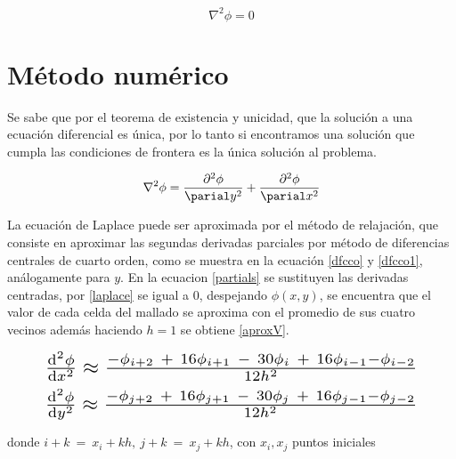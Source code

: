 \begin{equation}
\label{laplace}
    \nabla^2 \phi =0
\end{equation}

\section{ Método numérico}

Se sabe que por el teorema de existencia y unicidad, que la solución a una ecuación diferencial es única, por lo tanto si encontramos una solución que cumpla las condiciones de frontera es la única solución al problema. 

\begin{equation}
\label{partials}
\nabla^2 \phi = \frac{\partial^2 \phi}{\parial y^2} + \frac{\partial^2 \phi}{\parial x^2} 
\end{equation}




La ecuación de Laplace puede ser aproximada por el método de relajación, que consiste en aproximar las segundas derivadas parciales por método de diferencias centrales de cuarto orden, como se muestra en la ecuación \ref{dfcco} y \ref{dfcco1}, análogamente para $y$. En la ecuacion \ref{partials} se sustituyen las derivadas centradas, por \ref{laplace} se igual a 0, despejando $\phi(x,y)$, se encuentra que  el valor de cada celda del mallado se aproxima con el promedio de sus cuatro vecinos además haciendo $h=1$ se obtiene \ref{aproxV}.




\begin{equation}
\label{dfcco1}
\resizebox{.9\columnwidth }{!}{
$\dv[2]{\phi}{x} \approx \frac{-\phi_{i+2}\ +\ 16\phi_{i+1}\ -\ 30\phi_{i}\ +\ 16\phi_{i-1} -\phi_{i-2} }{12h^{2}} $
}
\end{equation}
\begin{equation}
\label{dfcco}
\resizebox{.9\columnwidth }{!}{
$\dv[2]{\phi}{y} \approx \frac{-\phi_{j+2}\ +\ 16\phi_{j+1}\ -\ 30\phi_{j}\ +\ 16\phi_{j-1} -\phi_{j-2} }{12h^{2}} $
}
\end{equation}

\noindent \small{donde $i+k\ =\ x_{i}+kh,\ j+k\ =\ x_{j}+kh $, con $x_{i}, x_{j}$ puntos  iniciales} 


